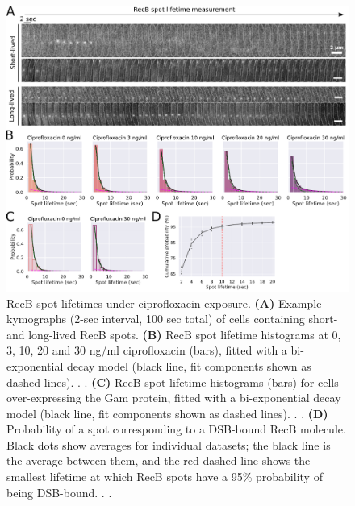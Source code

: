 \begin{figure}[htbp]
    \centering
    \includegraphics[width=.8\textwidth]{Figures/Fig2_RecB_lifetime.pdf}
    \caption{RecB spot lifetimes under ciprofloxacin exposure. \textbf{(A)} Example kymographs (2-sec interval, 100 sec total) of cells containing short- and long-lived RecB spots. \textbf{(B)} RecB spot lifetime histograms at 0, 3, 10, 20 and 30 ng/ml ciprofloxacin (bars), fitted with a bi-exponential decay model (black line, fit components shown as dashed lines). . . \textbf{(C)} RecB spot lifetime histograms (bars) for cells over-expressing the Gam protein, fitted with a bi-exponential decay model (black line, fit components shown as dashed lines). . . \textbf{(D)} Probability of a spot corresponding to a DSB-bound RecB molecule. Black dots show averages for individual datasets; the black line is the average between them, and the red dashed line shows the smallest lifetime at which RecB spots have a 95\% probability of being DSB-bound. . .}
    \label{Fig:lifetimes}
\end{figure}

